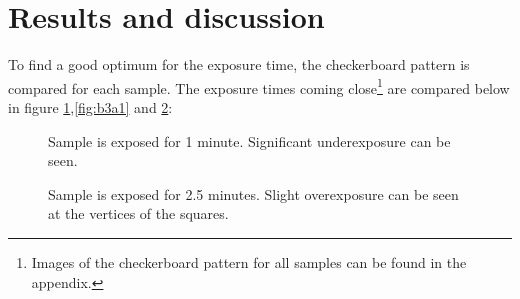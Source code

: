 \section*{Results and discussion}
To find a good optimum for the exposure time, the checkerboard pattern is compared for each sample. The exposure times coming close\footnote{Images of the checkerboard pattern for all samples can be found in the appendix.} are compared below in figure \ref{fig:b3d1},\ref{fig:b3a1} and \ref{fig:b3e1}:

\begin{figure}[H]
	\centering
	\caption{Sample is exposed for 1 minute. Significant underexposure can be seen.}
	\label{fig:b3d1}
\end{figure}
\begin{figure}[H]
	\centering
	\caption{Sample is exposed for 2.5 minutes. Slight overexposure can be seen at the vertices of the squares.}
	\label{fig:b3e1}
\end{figure}
